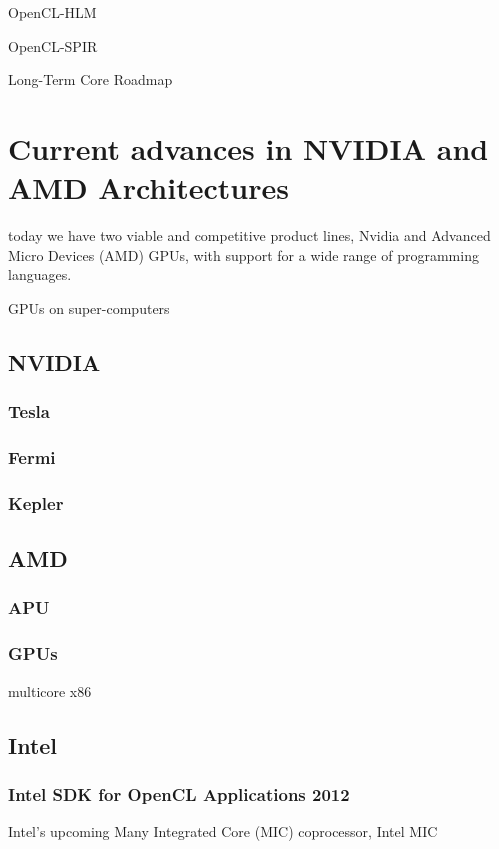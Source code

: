 OpenCL-HLM

OpenCL-SPIR

Long-Term Core Roadmap



\section{Current advances in NVIDIA and AMD Architectures}
today we have two viable and
competitive product lines, Nvidia and Advanced
Micro Devices (AMD) GPUs, with support for a
wide range of programming languages.

GPUs on super-computers

\subsection{NVIDIA}
\subsubsection{Tesla}
\subsubsection{Fermi}
\subsubsection{Kepler}

\subsection{AMD}
\subsubsection{APU}
\subsubsection{GPUs}
multicore x86

\subsection{Intel}
\subsubsection{Intel SDK for OpenCL Applications 2012}

Intel's upcoming Many Integrated Core (MIC) coprocessor, Intel MIC
